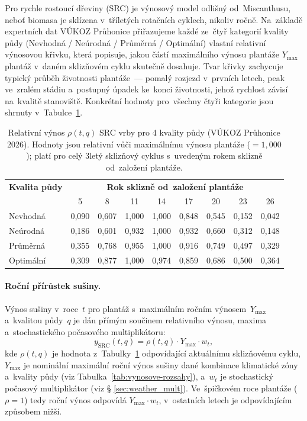 Pro rychle rostoucí dřeviny (SRC) je výnosový model odlišný od~Miscanthusu,
neboť biomasa je sklízena v~tříletých rotačních cyklech, nikoliv ročně.
Na~základě expertních dat VÚKOZ Průhonice \citep{VUKOZ2026} přiřazujeme
každé ze~čtyř kategorií kvality půdy (Nevhodná / Neúrodná / Průměrná /
Optimální) vlastní relativní výnosovou křivku, která popisuje, jakou
částí maximálního výnosu plantáže $Y_{\max}$ plantáž v~daném sklizňovém
cyklu skutečně dosahuje. Tvar křivky zachycuje typický průběh životnosti
plantáže~--- pomalý rozjezd v~prvních letech, peak ve~zralém stádiu a~postupný úpadek ke~konci životnosti, jehož rychlost závisí
na~kvalitě stanoviště. Konkrétní hodnoty pro~všechny čtyři kategorie
jsou shrnuty v~Tabulce~\ref{tab:src-yield-curves}.

\begin{table}[H]
\centering
\caption{Relativní výnos $\rho(t, q)$ SRC vrby pro 4 kvality půdy
(VÚKOZ Průhonice 2026). Hodnoty jsou relativní vůči maximálnímu výnosu
plantáže ($=1{,}000$); platí pro celý 3letý sklizňový cyklus s~uvedeným
rokem sklizně od~založení plantáže.}
\label{tab:src-yield-curves}
\small
\begin{tabular}{lcccccccc}
\toprule
\textbf{Kvalita půdy} & \multicolumn{8}{c}{\textbf{Rok sklizně od~založení plantáže}} \\
                                              & 5 & 8 & 11 & 14 & 17 & 20 & 23 & 26 \\
\midrule
Nevhodná   & 0{,}090 & 0{,}607 & 1{,}000 & 1{,}000 & 0{,}848 & 0{,}545 & 0{,}152 & 0{,}042 \\
Neúrodná   & 0{,}186 & 0{,}601 & 0{,}932 & 1{,}000 & 0{,}932 & 0{,}660 & 0{,}312 & 0{,}148 \\
Průměrná   & 0{,}355 & 0{,}768 & 0{,}955 & 1{,}000 & 0{,}916 & 0{,}749 & 0{,}497 & 0{,}329 \\
Optimální  & 0{,}309 & 0{,}877 & 1{,}000 & 0{,}974 & 0{,}859 & 0{,}686 & 0{,}500 & 0{,}364 \\
\bottomrule
\end{tabular}
\end{table}

\paragraph{Roční přírůstek sušiny.}
Výnos sušiny v~roce~$t$ pro plantáž s~maximálním ročním výnosem~$Y_{\max}$
a~kvalitou půdy~$q$ je dán přímým součinem relativního výnosu, maxima
a~stochastického počasového multiplikátoru:
\begin{equation}
    y_{\mathrm{SRC}}(t, q) = \rho(t, q) \cdot Y_{\max} \cdot w_t,
    \label{eq:src-yield-method}
\end{equation}
kde $\rho(t, q)$ je hodnota z~Tabulky~\ref{tab:src-yield-curves}
odpovídající aktuálnímu sklizňovému cyklu, $Y_{\max}$ je nominální
maximální roční výnos sušiny dané kombinace klimatické zóny a~kvality
půdy (viz Tabulka~\ref{tab:vynosove-rozsahy}), a~$w_t$ je stochastický
počasový multiplikátor (viz § \ref{sec:weather_mult}). Ve~špičkovém
roce plantáže ($\rho = 1$) tedy roční výnos odpovídá $Y_{\max} \cdot w_t$,
v~ostatních letech je odpovídajícím způsobem nižší.

